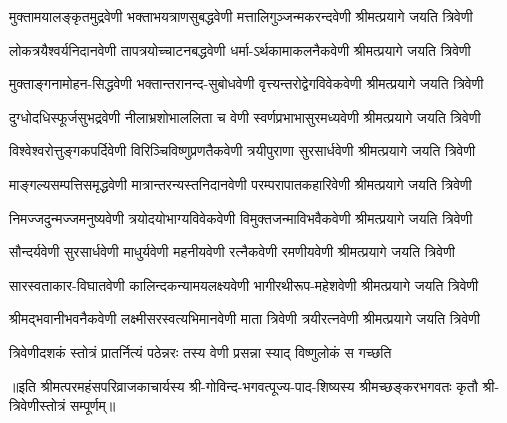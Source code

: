 
\twolineshloka
{मुक्तामयालङ्कृतमुद्रवेणी भक्ताभयत्राणसुबद्धवेणी}
{मत्तालिगुञ्जन्मकरन्दवेणी श्रीमत्प्रयागे जयति त्रिवेणी}%

\twolineshloka
{लोकत्रयैश्वर्यनिदानवेणी तापत्रयोच्चाटनबद्धवेणी}
{धर्मा-ऽर्थकामाकलनैकवेणी श्रीमत्प्रयागे जयति त्रिवेणी}%

\twolineshloka
{मुक्ताङ्गनामोहन-सिद्धवेणी भक्तान्तरानन्द-सुबोधवेणी}
{वृत्त्यन्तरोद्वेगविवेकवेणी श्रीमत्प्रयागे जयति त्रिवेणी}%

\twolineshloka
{दुग्धोदधिस्फूर्जसुभद्रवेणी नीलाभ्रशोभाललिता च वेणी}
{स्वर्णप्रभाभासुरमध्यवेणी श्रीमत्प्रयागे जयति त्रिवेणी}%

\twolineshloka
{विश्वेश्वरोत्तुङ्गकपर्दिवेणी विरिञ्चिविष्णुप्रणतैकवेणी}
{त्रयीपुराणा सुरसार्धवेणी श्रीमत्प्रयागे जयति त्रिवेणी}%

\twolineshloka
{माङ्गल्यसम्पत्तिसमृद्धवेणी मात्रान्तरन्यस्तनिदानवेणी}
{परम्परापातकहारिवेणी श्रीमत्प्रयागे जयति त्रिवेणी}%

\twolineshloka
{निमज्जदुन्मज्जमनुष्यवेणी त्रयोदयोभाग्यविवेकवेणी}
{विमुक्तजन्माविभवैकवेणी श्रीमत्प्रयागे जयति त्रिवेणी}%

\twolineshloka
{सौन्दर्यवेणी सुरसार्धवेणी माधुर्यवेणी महनीयवेणी}
{रत्नैकवेणी रमणीयवेणी श्रीमत्प्रयागे जयति त्रिवेणी}%

\twolineshloka
{सारस्वताकार-विघातवेणी कालिन्दकन्यामयलक्ष्यवेणी}
{भागीरथीरूप-महेशवेणी श्रीमत्प्रयागे जयति त्रिवेणी}%

\twolineshloka
{श्रीमद्भवानीभवनैकवेणी लक्ष्मीसरस्वत्यभिमानवेणी}
{माता त्रिवेणी त्रयीरत्नवेणी श्रीमत्प्रयागे जयति त्रिवेणी}%

\twolineshloka
{त्रिवेणीदशकं स्तोत्रं प्रातर्नित्यं पठेन्नरः}
{तस्य वेणी प्रसन्ना स्याद् विष्णुलोकं स गच्छति}%

॥इति श्रीमत्परमहंसपरिव्राजकाचार्यस्य श्री-गोविन्द-भगवत्पूज्य-पाद-शिष्यस्य 
श्रीमच्छङ्करभगवतः कृतौ श्री-त्रिवेणीस्तोत्रं सम्पूर्णम्॥